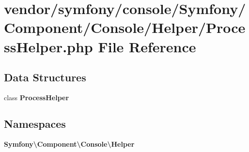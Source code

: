 \section{vendor/symfony/console/\+Symfony/\+Component/\+Console/\+Helper/\+Process\+Helper.php File Reference}
\label{_process_helper_8php}
\subsection*{Data Structures}
\begin{DoxyCompactItemize}
\item 
class {\bf Process\+Helper}
\end{DoxyCompactItemize}
\subsection*{Namespaces}
\begin{DoxyCompactItemize}
\item 
 {\bf Symfony\textbackslash{}\+Component\textbackslash{}\+Console\textbackslash{}\+Helper}
\end{DoxyCompactItemize}
